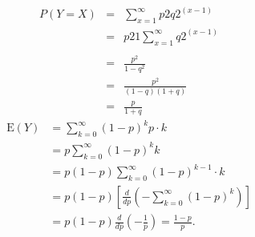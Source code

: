 \documentclass[a4paper,12pt]{article}
\begin{document}
\begin{enumerate}
\begin{table}[ht!]
\begin{tabular}{|p{15cm}|}
\\ \hline
 \end{tabular}
\end{table}

\begin{eqnarray*}
P(Y=X)  
&=&
\sum_{x=1}^{\infty }
p2q2^{(x- 1)} \\&=& p2
1 \sum_{x=1}^{\infty }
q2^{(x- 1)} \\
\\ &=& \frac{p^2}{1 -  q^2} 
\\ &=& \frac{p^2}{(1- q)(1+q)} \\ &=& \frac{p}{1+q}
\end{eqnarray*}
\newpage
\[{\displaystyle {\begin{aligned}\mathrm {E} (Y)&{}=\sum _{k=0}^{\infty }(1-p)^{k}p\cdot k\\&{}=p\sum _{k=0}^{\infty }(1-p)^{k}k\\&{}=p(1-p)\sum _{k=0}^{\infty }(1-p)^{k-1}\cdot k\\&{}=p(1-p)\left[{\frac {d}{dp}}\left(-\sum _{k=0}^{\infty }(1-p)^{k}\right)\right]\\&{}=p(1-p){\frac {d}{dp}}\left(-{\frac {1}{p}}\right)={\frac {1-p}{p}}.\end{aligned}}} 
\]
\end{enumerate}
\end{document}
